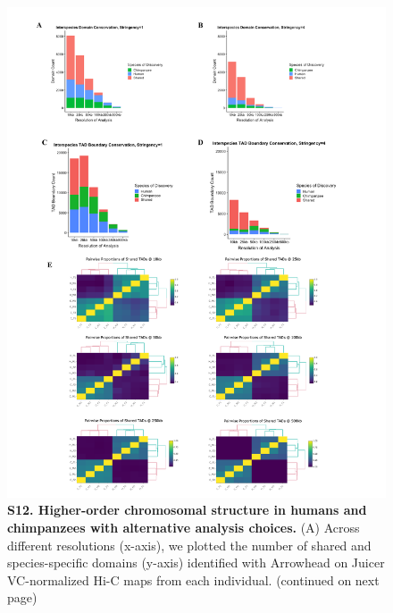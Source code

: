 \begin{figure}[!htb]
\centering
\includegraphics[width=6in]{img/figS12.1.pdf}
\caption[Higher-order chromosomal structure in humans and chimpanzees with alternative analysis choices.]{\textbf{S12. Higher-order chromosomal structure in humans and chimpanzees with alternative analysis choices.} (A) Across different resolutions (x-axis), we plotted the number of shared and species-specific domains (y-axis) identified with Arrowhead \cite{Durand.2016} on Juicer VC-normalized Hi-C maps from each individual. (continued on next page)}
\label{fig:ch02-figS12}
\end{figure}

